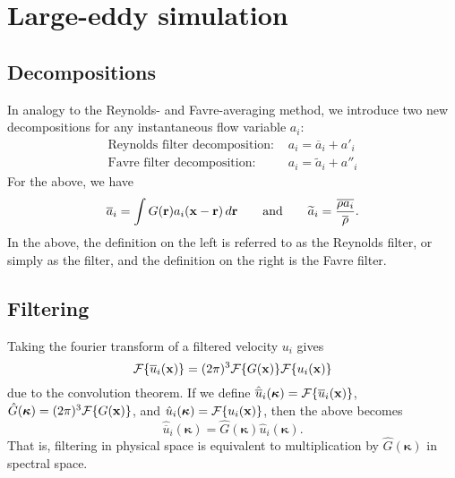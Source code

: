 \documentclass[oneside,a4paper,11pt]{report}
\newcommand{\rhoavg}{\overline{\rho}}
\newcommand{\aavg}{\overline{a}}
\newcommand{\afluc}{a'}
\newcommand{\kappavec}{\boldsymbol{\kappa}}
\newcommand{\aavgf}{\widetilde{a}}
\newcommand{\aflucf}{a''}
\newcommand{\ures}{\overline{u}}
\begin{document}
\chapter{Large-eddy simulation}

\section{Decompositions}
In analogy to the Reynolds- and Favre-averaging method, we introduce two new decompositions for any instantaneous flow variable  $a_i$:
\begin{align}
\text{Reynolds filter decomposition: } & a_i = \aavg_i + \afluc_i \\
\text{Favre filter decomposition: } & a_i = \aavgf_i + \aflucf_i
\end{align}
For the above, we have
\begin{equation} 
\aavg_i = \int G(\rvec) a_i(\xvec - \rvec) \, d\rvec \qquad \text{and} \qquad \aavgf_i = \frac{\overline{ \rho a_i }}{\rhoavg}.
\end{equation}
In the above, the definition on the left is referred to as the Reynolds filter, or simply as the filter, and the definition on the right is the Favre filter.

\section{Filtering}
Taking the fourier transform of a filtered velocity $u_i$ gives
\begin{equation}
\mathcal{F}\{ \ures_i(\xvec) \} = (2 \pi)^3 \mathcal{F} \{ G(\xvec) \} \mathcal{F} \{ u_i(\xvec) \}
\end{equation}
due to the convolution theorem. If we define $\hat{\ures}_i (\kappavec) = \mathcal{F}\{ \ures_i(\xvec) \}$, $\hat{G}(\kappavec) = (2 \pi )^3 \mathcal{F} \{ G(\xvec) \}$, and $\hat{u}_i(\kappavec) = \mathcal{F} \{ u_i(\xvec) \}$, then the above becomes
\begin{equation}
\hat{\ures}_i (\kappavec) = \hat{G}(\kappavec) \hat{u}_i(\kappavec).
\end{equation}
That is, filtering in physical space is equivalent to multiplication by $\hat{G}(\kappavec)$ in spectral space.
\end{document}
